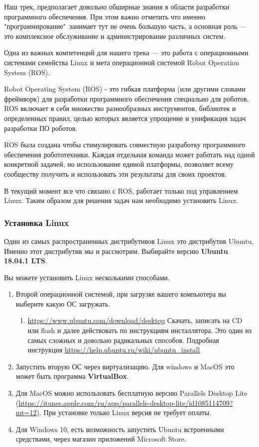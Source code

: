Наш трек, предполагает довольно обширные знания в области разработки программного обеспечения. При этом важно отметить что именно "программирование"\ занимает тут не очень большую часть, а основная роль — это комплексное обслуживание и администрирование различных систем.

Одна из важных компетенций для нашего трека — это работа с операционными системами семейства Linux и мета операционной системой Robot Operation System (ROS).

Robot Operating System (ROS) - это гибкая платформа (или другими словами фреймворк) для разработки программного обеспечения специально для роботов. ROS включает в себя множество разнообразных инструментов, библиотек и определенных правил, целью которых является упрощение и унификация задач разработки ПО роботов.

ROS была создана чтобы стимулировать совместную разработку программного обеспечения робототехники. Каждая отдельная команда может работать над одной конкретной задачей, но использование единой платформы, позволяет всему сообществу получить и использовать эти результаты для своих проектов.

В текущий момент все что связано с ROS, работает только под управлением Linux. Таким образом для решения задач нам необходимо установить Linux.

\subsubsection*{Установка Linux}

Один из самых распространенных дистрибутивов Linux это дистрибутив Ubuntu. Именно этот дистрибутив мы и рассмотрим. Выбирайте версию \textbf{Ubuntu 18.04.1 LTS}.

Вы можете установить Linux несколькими способами.
\begin{enumerate}
    \item Второй операционной системой, при загрузке вашего компьютера вы выберите какую ОС загружать. 
    \begin{enumerate}
        \item \url{https://www.ubuntu.com/download/desktop} Скачать, записать на CD или flash и далее действовать по инструкциям инсталлятора. Это один из самых сложных и довольно радикальных способов. Подробная инструкция \url{https://help.ubuntu.ru/wiki/ubuntu_install}
    \end{enumerate}
    \item Запустить вторую ОС через виртуализацию. Для windows и MacOS это может быть программа \textbf{VirtualBox}.
    \item Для MacOS можно использовать бесплатную версию Parallels Desktop Lite (\url{https://itunes.apple.com/ru/app/parallels-desktop-lite/id1085114709?mt=12}). При установке только Linux версия не требует оплаты.
    \item Для Windows 10, есть возможность запустить Ubuntu встроенными средствами, через магазин приложений Microsoft Store.
\end{enumerate}

